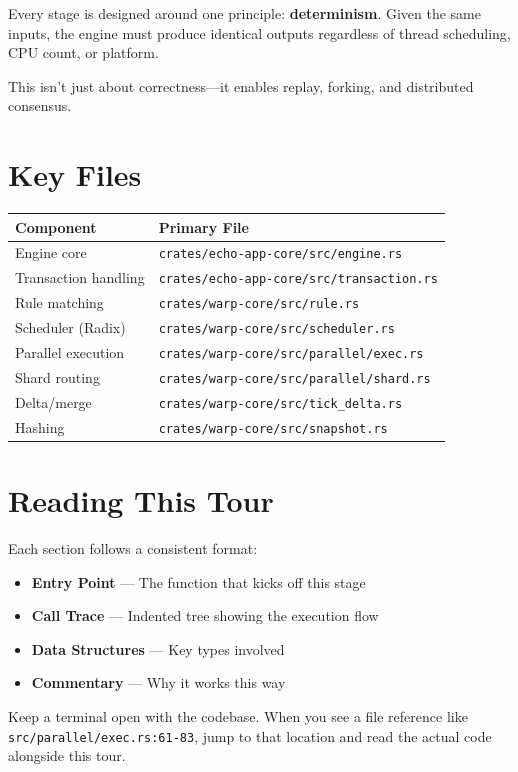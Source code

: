 \begin{bigpicture}
Every stage is designed around one principle: \textbf{determinism}. Given the same inputs, the engine must produce identical outputs regardless of thread scheduling, CPU count, or platform.

This isn't just about correctness---it enables replay, forking, and distributed consensus.
\end{bigpicture}

\section{Key Files}

\begin{tabular}{ll}
\toprule
\textbf{Component} & \textbf{Primary File} \\
\midrule
Engine core & \texttt{crates/echo-app-core/src/engine.rs} \\
Transaction handling & \texttt{crates/echo-app-core/src/transaction.rs} \\
Rule matching & \texttt{crates/warp-core/src/rule.rs} \\
Scheduler (Radix) & \texttt{crates/warp-core/src/scheduler.rs} \\
Parallel execution & \texttt{crates/warp-core/src/parallel/exec.rs} \\
Shard routing & \texttt{crates/warp-core/src/parallel/shard.rs} \\
Delta/merge & \texttt{crates/warp-core/src/tick\_delta.rs} \\
Hashing & \texttt{crates/warp-core/src/snapshot.rs} \\
\bottomrule
\end{tabular}

\section{Reading This Tour}

Each section follows a consistent format:

\begin{itemize}
    \item \textbf{Entry Point} --- The function that kicks off this stage
    \item \textbf{Call Trace} --- Indented tree showing the execution flow
    \item \textbf{Data Structures} --- Key types involved
    \item \textbf{Commentary} --- Why it works this way
\end{itemize}

\begin{protip}
Keep a terminal open with the codebase. When you see a file reference like \texttt{src/parallel/exec.rs:61-83}, jump to that location and read the actual code alongside this tour.
\end{protip}
